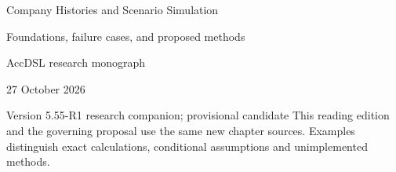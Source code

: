 \documentclass[11pt,a4paper]{report}
\begin{document}
\hypersetup{pageanchor=false}
\begin{titlepage}
{\Huge Company Histories and Scenario Simulation\par}
\vspace{12mm}
{\Large Foundations, failure cases, and proposed methods\par}
\vspace{8mm}
AccDSL research monograph\par 27 October 2026\par Version 5.55-R1 research companion; provisional candidate
\vfill
This reading edition and the governing proposal use the same new chapter sources. Examples distinguish exact calculations, conditional assumptions and unimplemented methods.
\end{titlepage}
\hypersetup{pageanchor=true}
\tableofcontents
\clearpage{}


























\clearpage\label{sim:body-end}

\begingroup\raggedright
\endgroup
\end{document}
